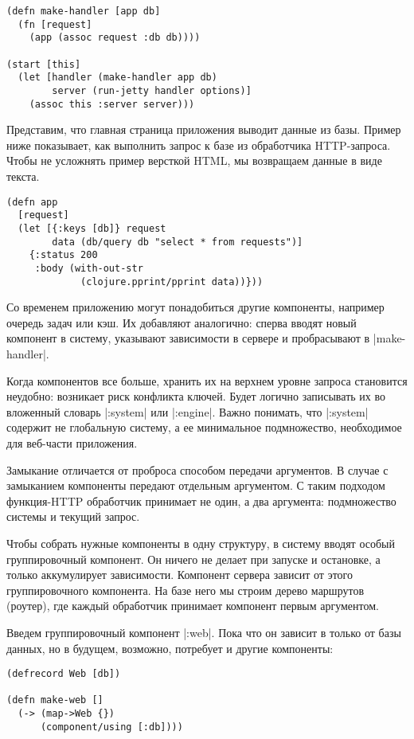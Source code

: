 \begin{verbatim}
(defn make-handler [app db]
  (fn [request]
    (app (assoc request :db db))))

(start [this]
  (let [handler (make-handler app db)
        server (run-jetty handler options)]
    (assoc this :server server)))
\end{verbatim}

Представим, что главная страница приложения выводит данные из базы. Пример ниже
показывает, как выполнить запрос к базе из обработчика HTTP-запроса. Чтобы не
усложнять пример версткой HTML, мы возвращаем данные в виде текста.

\begin{verbatim}
(defn app
  [request]
  (let [{:keys [db]} request
        data (db/query db "select * from requests")]
    {:status 200
     :body (with-out-str
             (clojure.pprint/pprint data))}))
\end{verbatim}

Со временем приложению могут понадобиться другие компоненты, например очередь
задач или кэш. Их добавляют аналогично: сперва вводят новый компонент в систему,
указывают зависимости в сервере и пробрасывают в \spverb|make-handler|.

Когда компонентов все больше, хранить их на верхнем уровне запроса становится
неудобно: возникает риск конфликта ключей. Будет логично записывать их во
вложенный словарь \spverb|:system| или \spverb|:engine|. Важно понимать, что \spverb|:system|
содержит не глобальную систему, а ее минимальное подмножество, необходимое для
веб-части приложения.

Замыкание отличается от проброса способом передачи аргументов. В случае с
замыканием компоненты передают отдельным аргументом. С таким подходом
функция-HTTP обработчик принимает не один, а два аргумента: подмножество системы
и текущий запрос.

Чтобы собрать нужные компоненты в одну структуру, в систему вводят особый
группировочный компонент. Он ничего не делает при запуске и остановке, а только
аккумулирует зависимости. Компонент сервера зависит от этого группировочного
компонента. На базе него мы строим дерево маршрутов (роутер), где каждый
обработчик принимает компонент первым аргументом.

Введем группировочный компонент \spverb|:web|. Пока что он зависит в только от базы
данных, но в будущем, возможно, потребует и другие компоненты:

\begin{verbatim}
(defrecord Web [db])

(defn make-web []
  (-> (map->Web {})
      (component/using [:db])))
\end{verbatim}


